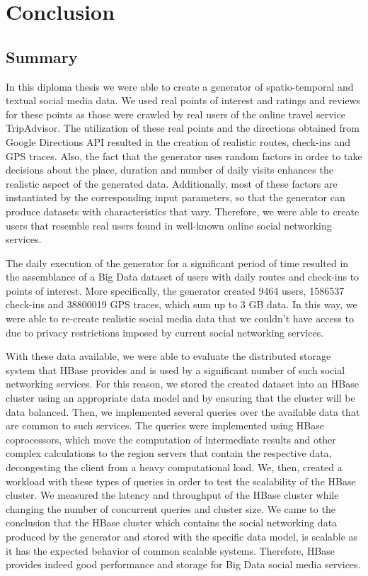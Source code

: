 \chapter{Conclusion}

\section{Summary}

In this diploma thesis we were able to create a generator of spatio-temporal and textual social media data. We used real points of interest and ratings and reviews 
for these points as those were crawled by real users of the online travel service TripAdvisor. The utilization of these real points and the directions obtained 
from Google Directions API resulted in the creation of realistic routes, check-ins and GPS traces. Also, the fact that the generator uses random factors in order 
to take decisions about the place, duration and number of daily visits enhances the realistic aspect of the generated data. Additionally, most of these factors 
are instantiated by the corresponding input parameters, so that the generator can produce datasets with characteristics that vary. Therefore, we were able to create 
users that resemble real users found in well-known online 
social networking services. 

The daily execution of the generator for a significant period of time resulted in the assemblance of a Big Data dataset of users with daily routes and 
check-ins to points of interest. More specifically, the generator created 9464 users, 1586537 check-ins and 38800019 GPS traces, which sum up to 3 GB data. 
In this way, we were able to re-create realistic social media data that we couldn't have access to due to privacy restrictions imposed by 
current social networking services. 

With these data available, we were able to evaluate the distributed storage system that HBase provides and is used by a significant 
number of such social networking services. For this reason, we stored the created dataset into an HBase cluster using an appropriate data model and by 
ensuring that the cluster will be data balanced. Then, 
we implemented several queries over the available data that are common to such 
services. The queries were implemented using HBase coprocessors, which move the computation of intermediate results and other complex calculations 
to the region servers that contain the respective data, decongesting the client from a heavy computational load. We, then, created a workload with these 
types of queries in order to test the scalability of the HBase cluster. We measured the latency and throughput of 
the HBase cluster while changing the number of concurrent queries and cluster size. We came to the conclusion that 
the HBase cluster which contains the social networking data produced by the generator and stored with the specific data model, is 
scalable as it has the expected behavior of common scalable systems. 
Therefore, HBase provides indeed good performance and storage for Big Data social media services. 

